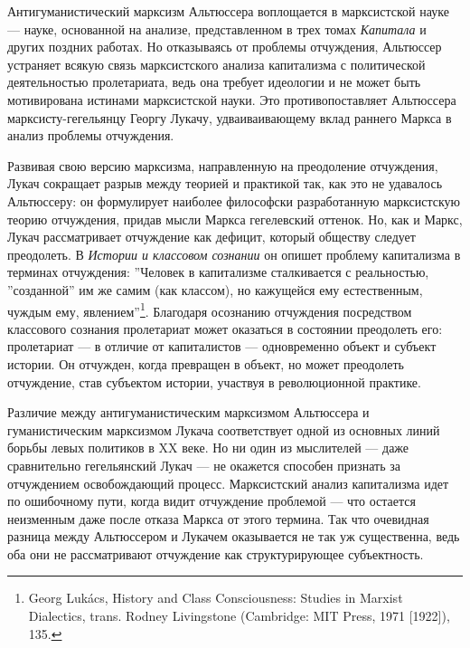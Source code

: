 \documentclass[12pt]{book}
\begin{document}
Антигуманистический марксизм Альтюссера воплощается в марксистской науке --- науке, основанной на анализе, представленном в трех томах \textit{Капитала} и других поздних работах. Но отказываясь от проблемы отчуждения, Альтюссер устраняет всякую связь марксистского анализа капитализма с политической деятельностью пролетариата, ведь она требует идеологии и не может быть мотивирована истинами марксистской науки. Это противопоставляет Альтюссера марксисту-гегельянцу Георгу Лукачу, удваиваивающему вклад раннего Маркса в анализ проблемы отчуждения.

Развивая свою версию марксизма, направленную на преодоление отчуждения, Лукач сокращает разрыв между теорией и практикой так, как это не удавалось Альтюссеру: он формулирует наиболее философски разработанную марксистскую теорию отчуждения, придав мысли Маркса гегелевский оттенок. Но, как и Маркс, Лукач рассматривает отчуждение как дефицит, который обществу следует преодолеть. В \textit{Истории и классовом сознании} он опишет проблему капитализма в терминах отчуждения: ''Человек в капитализме сталкивается с реальностью, ''созданной'' им же самим (как классом), но кажущейся ему естественным, чуждым ему, явлением''\footnote{Georg Lukács, History and Class Consciousness: Studies in Marxist Dialectics, trans. Rodney Livingstone (Cambridge: MIT Press, 1971 [1922]), 135.}. Благодаря осознанию отчуждения посредством классового сознания пролетариат может оказаться в состоянии преодолеть его: пролетариат --- в отличие от капиталистов --- одновременно объект и субъект истории. Он отчужден, когда превращен в объект, но может преодолеть отчуждение, став субъектом истории, участвуя в революционной практике.

Различие между антигуманистическим марксизмом Альтюссера и гуманистическим марксизмом Лукача соответствует одной из основных линий борьбы левых политиков в XX веке. Но ни один из мыслителей --- даже сравнительно гегельянский Лукач --- не окажется способен признать за отчуждением освобождающий процесс. Марксистский анализ капитализма идет по ошибочному пути, когда видит отчуждение проблемой --- что остается неизменным даже после отказа Маркса от этого термина. Так что очевидная разница между Альтюссером и Лукачем оказывается не так уж существенна, ведь оба они не рассматривают отчуждение как структурирующее субъектность.
\end{document}
